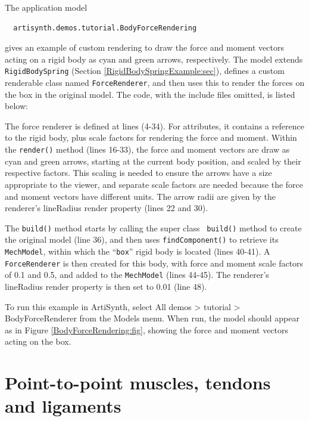 The application model
%
\begin{verbatim}
  artisynth.demos.tutorial.BodyForceRendering
\end{verbatim}
%
gives an example of custom rendering to draw the force and moment
vectors acting on a rigid body as cyan and green arrows,
respectively. The model extends {\tt RigidBodySpring}
(Section \ref{RigidBodySpringExample:sec}), defines a custom
renderable class named {\tt ForceRenderer}, and then uses this to
render the forces on the box in the original model. The code, with the
include files omitted, is listed below:
%
\lstset{numbers=left}
\iflatexml

\else

\fi
\lstset{numbers=none}
%
The force renderer is defined at lines (4-34). For attributes, it
contains a reference to the rigid body, plus scale factors for
rendering the force and moment. Within the {\tt render()} method
(lines 16-33), the force and moment vectors are draw as cyan and green
arrows, starting at the current body position, and scaled by their
respective factors. This scaling is needed to ensure the arrows have a
size appropriate to the viewer, and separate scale factors are needed
because the force and moment vectors have different units. The arrow
radii are given by the renderer's {\sf lineRadius} render property
(lines 22 and 30).

The {\tt build()} method starts by calling the super class {\tt
build()} method to create the original model (line 36), and then uses
{\tt findComponent()} to retrieve its {\tt MechModel}, within which
the ``{\tt box}'' rigid body is located (lines 40-41). A {\tt
ForceRenderer} is then created for this body, with force and moment
scale factors of 0.1 and 0.5, and added to the {\tt MechModel} (lines
44-45). The renderer's {\sf lineRadius} render property is then set to
0.01 (line 48).

To run this example in ArtiSynth, select {\sf All demos > tutorial >
BodyForceRenderer} from the {\sf Models} menu. When run, the model
should appear as in Figure \ref{BodyForceRendering:fig}, showing the
force and moment vectors acting on the box.

\section{Point-to-point muscles, tendons and ligaments}
\label{PointToPointMuscles:sec}

